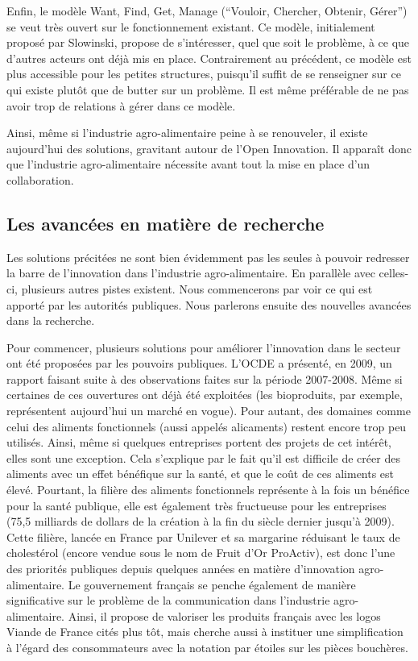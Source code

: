 \documentclass[a4paper,10pt]{report}
\begin{document}
			Enfin, le modèle Want, Find, Get, Manage (“Vouloir, Chercher, Obtenir, Gérer”) se veut très ouvert sur le fonctionnement existant. Ce modèle, initialement proposé par Slowinski, propose de s’intéresser, quel que soit le problème, à ce que d’autres acteurs ont déjà mis en place. Contrairement au précédent, ce modèle est plus accessible pour les petites structures, puisqu’il suffit de se renseigner sur ce qui existe plutôt que de butter sur un problème. Il est même préférable de ne pas avoir trop de relations à gérer dans ce modèle.
			
			Ainsi, même si l’industrie agro-alimentaire peine à se renouveler, il existe aujourd’hui des solutions, gravitant autour de l’Open Innovation. Il apparaît donc que l’industrie agro-alimentaire nécessite avant tout la mise en place d’un collaboration.
			
		\subsection{Les avancées en matière de recherche}
			Les solutions précitées ne sont bien évidemment pas les seules à pouvoir redresser la barre de l’innovation dans l’industrie agro-alimentaire. En parallèle avec celles-ci, plusieurs autres pistes existent. Nous commencerons par voir ce qui est apporté par les autorités publiques. Nous parlerons ensuite des nouvelles avancées dans la recherche.
			
			Pour commencer, plusieurs solutions pour améliorer l’innovation dans le secteur ont été proposées par les pouvoirs publiques. L’OCDE a présenté, en 2009, un rapport \cite{OECD} faisant suite à des observations faites sur la période 2007-2008. Même si certaines de ces ouvertures ont déjà été exploitées (les bioproduits, par exemple, représentent aujourd’hui un marché en vogue). Pour autant, des domaines comme celui des aliments fonctionnels (aussi appelés alicaments) restent encore trop peu utilisés. Ainsi, même si quelques entreprises portent des projets de cet intérêt, elles sont une exception. Cela s’explique par le fait qu’il est difficile de créer des aliments avec un effet bénéfique sur la santé, et que le coût de ces aliments est élevé. Pourtant, la filière des aliments fonctionnels représente à la fois un bénéfice pour la santé publique, elle est également très fructueuse pour les entreprises (75,5 milliards de dollars de la création à la fin du siècle dernier jusqu’à 2009). Cette filière, lancée en France par Unilever et sa margarine réduisant le taux de cholestérol (encore vendue sous le nom de Fruit d’Or ProActiv), est donc l’une des priorités publiques depuis quelques années en matière d’innovation agro-alimentaire. Le gouvernement français se penche également de manière significative sur le problème de la communication dans l’industrie agro-alimentaire. Ainsi, il propose de valoriser les produits français avec les logos Viande de France cités plus tôt, mais cherche aussi à instituer une simplification à l’égard des consommateurs avec la notation par étoiles sur les pièces bouchères. 
\end{document}
